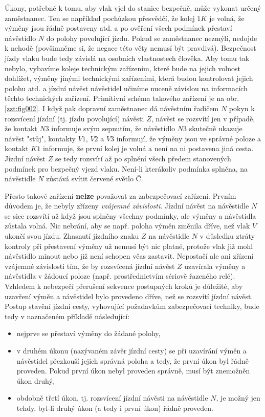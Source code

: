   Úkony, potřebné k tomu, aby vlak vjel do stanice bezpečně, může vykonat určený zaměstnanec. Ten
  se například pochůzkou přesvědčí, že kolej \(1K\) je volná, že výměny jsou řádně postaveny atd. a 
  po ověření všech podmínek přestaví návěstidlo \(N\) do polohy povolující jízdu. Pokud se 
  zaměstnanec nezmýlí, nedojde k nehodě (povšimněme si, že negace této věty nemusí být pravdivá). 
  Bezpečnost jízdy vlaku bude tedy závislá na osobních vlastnostech člověka. Aby tomu tak nebylo, 
  vybavíme koleje technickým zařízením, které bude na jejich volnost dohlížet, výměny jinými
  technickými zařízeními, která budou kontrolovat jejich polohu atd. a jízdní návěst návěstidel
  učiníme nuceně závislou na informacích těchto technických zařízení. Primitivní schéma
  takového zařízení je na obr. \ref{zzt:fig002}. I když pak dopravní zaměstnanec dá návěstním 
  řadičem \(N\) pokyn k rozsvícení jízdní (tj. jízdu povolující) návěsti \(Z\), návěst se rozsvítí 
  jen v případě, že kontakt \(N3\) informuje svým sepnutím, že návěstidlo \(N3\) skutečně ukazuje 
  návěst "stůj", kontakty \(V1\), \(V2\) a \(V3\) informují, že výměny jsou ve správné poloze a 
  kontakt \(K1\) informuje, že první kolej je volná a není na ni postavena jiná cesta. Jízdní 
  návěst \(Z\) se tedy rozsvítí až po splnění všech předem stanovených podmínek pro bezpečný vjezd 
  vlaku. Není-li kterákoliv podmínka splněna, na návěstidle \(N\) zůstává svítit červené světlo Č. 
  
  Přesto takové zařízení \textbf{nelze} považovat za zabezpečovací zařízení. Prvním důvodem je, že 
  nebyly zřízeny \emph{vzájemné závislosti}. Jízdní návěst na návěstidle \(N\) se sice rozsvítí až 
  když jsou splněny všechny podmínky, ale výměny a návěstidla zůstala volná. Nic nebrání, aby se 
  např. poloha výměn změnila dříve, než vlak \(V\) ukončí svou jízdu. Zhasnutí jízdního znaku \(Z\) 
  na návěstidle \(N\) v důsledku ztráty kontroly při přestavení výměny už nemusí být nic platné, 
  protože vlak již mohl návěstidlo minout nebo již není schopen včas zastavit. Nepostačí ale ani 
  zřízení vzájemné závislosti tím, že by rozsvícená jízdní návěst \(Z\) uzavírala výměny a 
  návěstidla v žádoucí poloze (např. prostřednictvím sériově řazeného relé). Vzhledem k nebezpečí
  přerušení sekvence postupných kroků je důležité, aby uzavření výměn a návěstidel bylo provedeno 
  dříve, než se rozsvítí jízdní návěst. Postup stavění jízdní cesty, vyhovující požadavkům 
  zabezpečovací techniky, bude tedy v naznačeném příkladě následující:
  \begin{itemize}\addtolength{\itemsep}{-0.5\baselineskip}
    \item nejprve se přestaví výměny do žádané polohy,
    \item v druhém úkonu (nazývaném závěr jízdní cesty) se při uzavírání výměn a návěstidel 
          přezkouší jejich správná poloha a tedy, že první úkon byl řádně proveden. Pokud první 
          úkon nebyl proveden správně, musí být znemožněn úkon druhý,
    \item obdobně třetí úkon, tj. rozsvícení jízdní návěsti na návěstidle \(N\), je možný jen 
          tehdy, byl-li druhý úkon (a tedy i první úkon) řádně proveden. 
  \end{itemize}
  
